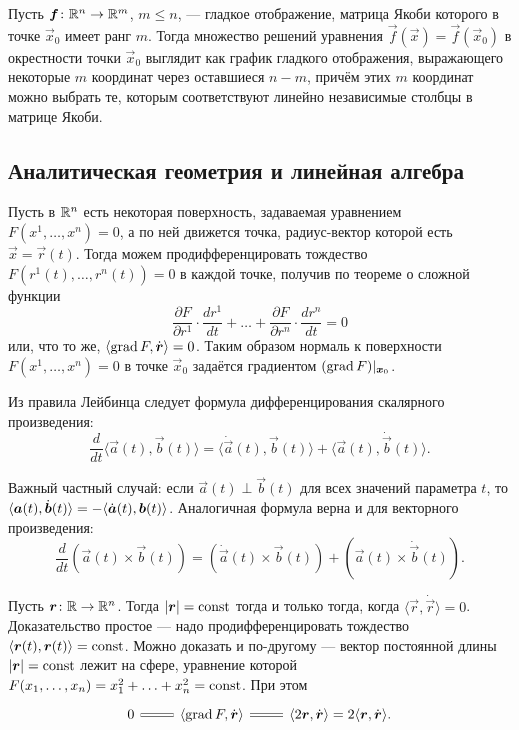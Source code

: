 \begin{theorem}
	Пусть $\boldsymbol{f}\colon \mathbb{R}^n \to \mathbb{R}^m$, $m \leqslant n$, --- гладкое отображение, матрица Якоби которого в точке $\vec{x}_0$ имеет ранг $m$. Тогда множество решений уравнения $\vec{f}(\vec{x}) = \vec{f}(\vec{x}_0)$ в окрестности точки $\vec{x}_0$ выглядит как график гладкого отображения, выражающего некоторые $m$ координат через оставшиеся $n - m$, причём этих $m$ координат можно выбрать те, которым соответствуют линейно независимые столбцы в матрице Якоби.
\end{theorem}

\subsection{Аналитическая геометрия и линейная алгебра}

Пусть в $\mathbb{R}^n$ есть некоторая поверхность, задаваемая уравнением $F(x^1, \ldots, x^n) = 0$, а по ней движется точка, радиус-вектор которой есть $\vec{x} = \vec{r}(t)$. Тогда можем продифференцировать тождество $F(r^1(t), \ldots, r^n(t)) = 0$ в каждой точке, получив по теореме о сложной функции
\[
	\frac{\partial F}{\partial r^1} \cdot \frac{d r^1}{dt} + \ldots + \frac{\partial F}{\partial r^n} \cdot \frac{d r^n}{dt} = 0
\]
или, что то же, $\langle \operatorname{grad} F, \dot{\boldsymbol{r}} \rangle = 0$. Таким образом нормаль к поверхности $F(x^1, \ldots, x^n) = 0$ в точке $\vec{x}_0$ задаётся градиентом $(\operatorname{grad} F)|_{\boldsymbol{x}_0}$.

Из правила Лейбинца следует формула дифференцирования скалярного произведения:
\[
	\frac{d}{dt}\langle \vec{a}(t), \vec{b}(t) \rangle = \langle \dot{\vec{a}}(t), \vec{b}(t) \rangle + \langle \vec{a}(t), \dot{\vec{b}}(t) \rangle.
\]

Важный частный случай: если $\vec{a}(t) \perp \vec{b}(t)$ для всех значений параметра $t$, то $\langle\vec{a}(t), \dot{\vec{b}}(t)\rangle \hm= -\langle\dot{\vec{a}}(t), \vec{b}(t)\rangle$. Аналогичная формула верна и для векторного произведения:
\[
	\frac{d}{dt}(\vec{a}(t) \times \vec{b}(t)) = (\dot{\vec{a}}(t) \times \vec{b}(t)) + (\vec{a}(t) \times \dot{\vec{b}}(t)).
\]

Пусть $\boldsymbol{r}\colon \mathbb{R} \to \mathbb{R}^n$. Тогда $\left\lvert\boldsymbol{r}\right\rvert = \mathrm{const}$ тогда и только тогда, когда $\langle \vec{r}, \dot{\vec{r}} \rangle = 0$. Доказательство простое --- надо продифференцировать тождество $\langle \boldsymbol{r}(t), \boldsymbol{r}(t) \rangle = \mathrm{const}$. Можно доказать и по-другому --- вектор постоянной длины $\left\lvert\boldsymbol{r}\right\rvert = \mathrm{const}$ лежит на сфере, уравнение которой $F(x_1, \ldots, x_n) = x_1^2 + \ldots + x_n^2 = \mathrm{const}$. При этом
\[\begin{tikzcd}
	{0} & {\langle\grad{F}, \dot{\vec{r}}\rangle} & {\langle 2\vec{r}, \dot{\vec{r}}\rangle = 2\langle\vec{r}, \dot{\vec{r}}\rangle}.
	\arrow[equals, from=1-2, to=1-1]
	\arrow[equals, from=1-2, to=1-3]
\end{tikzcd}\]

